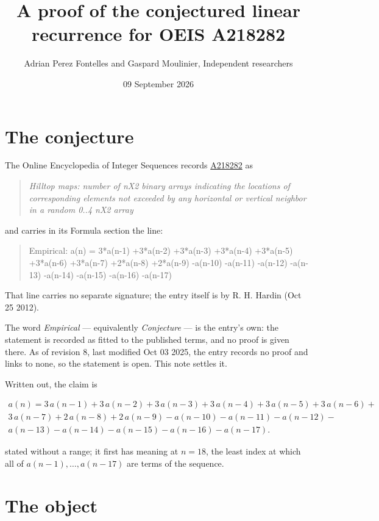 \documentclass[11pt]{article}
\title{A proof of the conjectured linear recurrence for OEIS A218282}
\author{Adrian Perez Fontelles and Gaspard Moulinier, Independent researchers}
\date{09 September 2026}
\theoremstyle{definition}
\begin{document}
\maketitle
\section{The conjecture}

The Online Encyclopedia of Integer Sequences records \href{https://oeis.org/A218282}{A218282} as

\begin{quote}\itshape Hilltop maps: number of nX2 binary arrays indicating the locations of corresponding elements not exceeded by any horizontal or vertical neighbor in a random 0..4 nX2 array\end{quote}

and carries in its Formula section the line:

\begin{quote}\ttfamily Empirical: a(n) = 3*a(n-1) +3*a(n-2) +3*a(n-3) +3*a(n-4) +3*a(n-5) +3*a(n-6) +3*a(n-7) +2*a(n-8) +2*a(n-9) -a(n-10) -a(n-11) -a(n-12) -a(n-13) -a(n-14) -a(n-15) -a(n-16) -a(n-17)\end{quote}

That line carries no separate signature; the entry itself is by R. H. Hardin (Oct 25 2012).

The word {\itshape Empirical} --- equivalently {\itshape Conjecture} --- is the entry's own: the statement is recorded as fitted to the published terms, and no proof is given there. As of revision 8, last modified Oct 03 2025, the entry records no proof and links to none, so the statement is open. This note settles it.

Written out, the claim is

\begin{multline*} a(n) = 3\,a(n-1) + 3\,a(n-2) + 3\,a(n-3) + 3\,a(n-4) + 3\,a(n-5) + 3\,a(n-6) + \\ 3\,a(n-7) + 2\,a(n-8) + 2\,a(n-9) - a(n-10) - a(n-11) - a(n-12) - \\ a(n-13) - a(n-14) - a(n-15) - a(n-16) - a(n-17). \end{multline*}

stated without a range; it first has meaning at $n = 18$, the least index at which all of $a(n-1),\dots,a(n-17)$ are terms of the sequence.

\section{The object}
\end{document}
